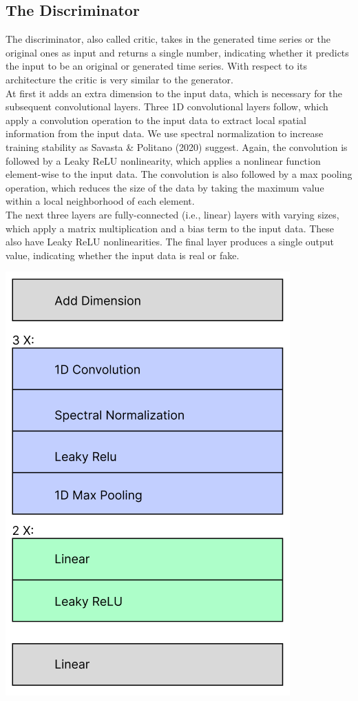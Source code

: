 \documentclass{article}
\begin{document}
\begin{multicols}{2}
    \section{The Discriminator}
    The discriminator, also called critic, takes in the generated time series or the original ones as input and returns a single number, indicating whether it predicts the input to be an original or generated time series. With respect to its architecture the critic is very similar to the generator. \\
    At first it adds an extra dimension to the input data, which is necessary for the subsequent convolutional layers. Three 1D convolutional layers follow, which apply a convolution operation to the input data to extract local spatial information from the input data. We use spectral normalization to increase training stability as Savasta \& Politano (2020) suggest. Again, the convolution is followed by a Leaky ReLU nonlinearity, which applies a nonlinear function element-wise to the input data. The convolution is also followed by a max pooling operation, which reduces the size of the data by taking the maximum value within a local neighborhood of each element. \\
    The next three layers are fully-connected (i.e., linear) layers with varying sizes, which apply a matrix multiplication and a bias term to the input data. These also have Leaky ReLU nonlinearities. The final layer produces a single output value, indicating whether the input data is real or fake.
    \begin{center}
        \includegraphics[scale=0.3]{imgs/stefan/discriminator-graphic-v1.png}
    \end{center}    
\end{multicols}
\end{document}
